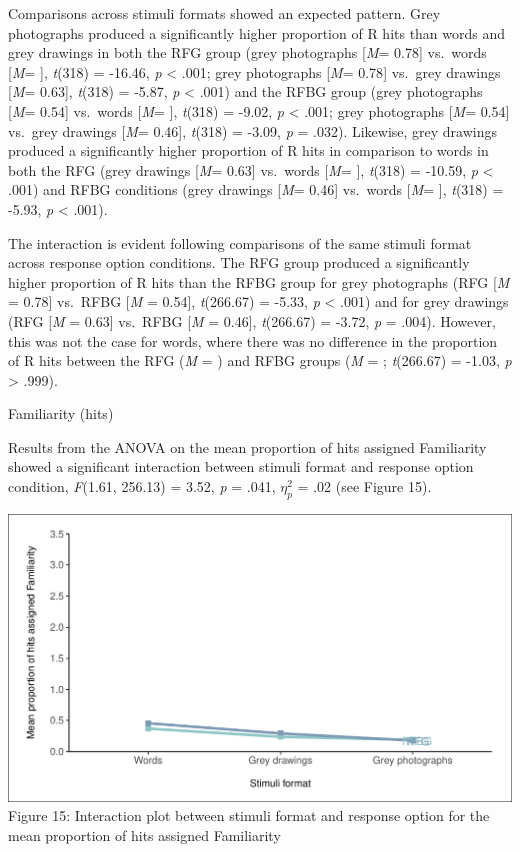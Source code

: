 \documentclass[
  11pt,
]{article}
\begin{document}
Comparisons across stimuli formats showed an expected pattern. Grey
photographs produced a significantly higher proportion of R hits than
words and grey drawings in both the RFG group (grey photographs
{[}\emph{M}= 0.78{]} vs.~words {[}\emph{M}= {]}, \emph{t}(318) = -16.46,
\emph{p} \textless{} .001; grey photographs {[}\emph{M}= 0.78{]}
vs.~grey drawings {[}\emph{M}= 0.63{]}, \emph{t}(318) = -5.87, \emph{p}
\textless{} .001) and the RFBG group (grey photographs {[}\emph{M}=
0.54{]} vs.~words {[}\emph{M}= {]}, \emph{t}(318) = -9.02, \emph{p}
\textless{} .001; grey photographs {[}\emph{M}= 0.54{]} vs.~grey
drawings {[}\emph{M}= 0.46{]}, \emph{t}(318) = -3.09, \emph{p} = .032).
Likewise, grey drawings produced a significantly higher proportion of R
hits in comparison to words in both the RFG (grey drawings {[}\emph{M}=
0.63{]} vs.~words {[}\emph{M}= {]}, \emph{t}(318) = -10.59, \emph{p}
\textless{} .001) and RFBG conditions (grey drawings {[}\emph{M}=
0.46{]} vs.~words {[}\emph{M}= {]}, \emph{t}(318) = -5.93, \emph{p}
\textless{} .001).

The interaction is evident following comparisons of the same stimuli
format across response option conditions. The RFG group produced a
significantly higher proportion of R hits than the RFBG group for grey
photographs (RFG {[}\emph{M} = 0.78{]} vs.~RFBG {[}\emph{M} = 0.54{]},
\emph{t}(266.67) = -5.33, \emph{p} \textless{} .001) and for grey
drawings (RFG {[}\emph{M} = 0.63{]} vs.~RFBG {[}\emph{M} = 0.46{]},
\emph{t}(266.67) = -3.72, \emph{p} = .004). However, this was not the
case for words, where there was no difference in the proportion of R
hits between the RFG (\emph{M} = ) and RFBG groups (\emph{M} = ;
\emph{t}(266.67) = -1.03, \emph{p} \textgreater{} .999).

Familiarity (hits)

Results from the ANOVA on the mean proportion of hits assigned
Familiarity showed a significant interaction between stimuli format and
response option condition, \emph{F}(1.61, 256.13) = 3.52, \emph{p} =
.041, \(\eta^2_p\) = .02 (see Figure 15).

\includegraphics{R--Thesis_files/figure-latex/unnamed-chunk-47-1.pdf}
Figure 15: Interaction plot between stimuli format and response option
for the mean proportion of hits assigned Familiarity ~~
\end{document}
